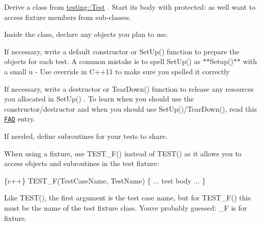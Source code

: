 \begin{DoxyEnumerate}
\item Derive a class from {\ttfamily \mbox{\hyperlink{classtesting_1_1_test}{testing\+::\+Test}}} . Start its body with {\ttfamily protected\+:} as we\textquotesingle{}ll want to access fixture members from sub-\/classes.
\end{DoxyEnumerate}
\begin{DoxyEnumerate}
\item Inside the class, declare any objects you plan to use.
\end{DoxyEnumerate}
\begin{DoxyEnumerate}
\item If necessary, write a default constructor or {\ttfamily Set\+Up()} function to prepare the objects for each test. A common mistake is to spell {\ttfamily Set\+Up()} as $\ast$$\ast${\ttfamily Setup()}$\ast$$\ast$ with a small {\ttfamily u} -\/ Use {\ttfamily override} in C++11 to make sure you spelled it correctly
\end{DoxyEnumerate}
\begin{DoxyEnumerate}
\item If necessary, write a destructor or {\ttfamily Tear\+Down()} function to release any resources you allocated in {\ttfamily Set\+Up()} . To learn when you should use the constructor/destructor and when you should use {\ttfamily Set\+Up()/\+Tear\+Down()}, read this \href{faq.md#should-i-use-the-constructordestructor-of-the-test-fixture-or-setupteardown}{\tt F\+AQ} entry.
\end{DoxyEnumerate}
\begin{DoxyEnumerate}
\item If needed, define subroutines for your tests to share.
\end{DoxyEnumerate}

When using a fixture, use {\ttfamily T\+E\+S\+T\+\_\+\+F()} instead of {\ttfamily T\+E\+S\+T()} as it allows you to access objects and subroutines in the test fixture\+:


\begin{DoxyCode}
\{c++\}
TEST\_F(TestCaseName, TestName) \{
  ... test body ...
\}
\end{DoxyCode}


Like {\ttfamily T\+E\+S\+T()}, the first argument is the test case name, but for {\ttfamily T\+E\+S\+T\+\_\+\+F()} this must be the name of the test fixture class. You\textquotesingle{}ve probably guessed\+: {\ttfamily \+\_\+F} is for fixture.

